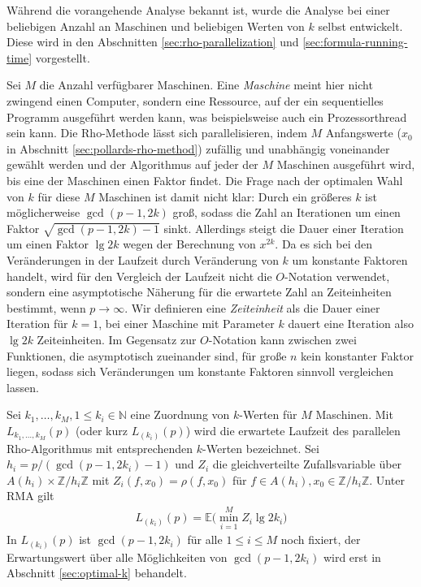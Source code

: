 \documentclass[a4paper, 11pt, ngerman]{article}
\newcommand{\E}{\mathbb{E}}
\newcommand{\N}{\mathbb{N}}
\newcommand{\Z}{\mathbb{Z}}
\theoremstyle{definition}
\theoremstyle{plain}
\theoremstyle{remark}
\begin{document}
Während die vorangehende Analyse bekannt ist, wurde die Analyse bei einer beliebigen Anzahl an Maschinen und beliebigen Werten von $k$ selbst entwickelt. Diese wird in den Abschnitten \ref{sec:rho-parallelization} und \ref{sec:formula-running-time} vorgestellt.

Sei $M$ die Anzahl verfügbarer Maschinen. Eine \emph{Maschine} meint hier nicht zwingend einen Computer, sondern eine Ressource, auf der ein sequentielles Programm ausgeführt werden kann, was beispielsweise auch ein Prozessorthread sein kann. Die Rho-Methode lässt sich parallelisieren, indem $M$ Anfangswerte ($x_0$ in Abschnitt \ref{sec:pollards-rho-method}) zufällig und unabhängig voneinander gewählt werden und der Algorithmus auf jeder der $M$ Maschinen ausgeführt wird, bis eine der Maschinen einen Faktor findet. Die Frage nach der optimalen Wahl von $k$ für diese $M$ Maschinen ist damit nicht klar: Durch ein größeres $k$ ist möglicherweise $\gcd(p - 1, 2k)$ groß, sodass die Zahl an Iterationen um einen Faktor $\sqrt{\gcd(p - 1, 2k) -1}$ sinkt. Allerdings steigt die Dauer einer Iteration um einen Faktor $\lg 2k$ wegen der Berechnung von $x^{2k}$. Da es sich bei den Veränderungen in der Laufzeit durch Veränderung von $k$ um konstante Faktoren handelt, wird für den Vergleich der Laufzeit nicht die $O$-Notation verwendet, sondern eine asymptotische Näherung für die erwartete Zahl an Zeiteinheiten bestimmt, wenn $p \to \infty$. Wir definieren eine \emph{Zeiteinheit} als die Dauer einer Iteration für $k = 1$, bei einer Maschine mit Parameter $k$ dauert eine Iteration also $\lg 2k$ Zeiteinheiten. Im Gegensatz zur $O$-Notation kann zwischen zwei Funktionen, die asymptotisch zueinander sind, für große $n$ kein konstanter Faktor liegen, sodass sich Veränderungen um konstante Faktoren sinnvoll vergleichen lassen.

Sei $k_1, \dots, k_M, 1 \le k_i \in \N$ eine Zuordnung von $k$-Werten für $M$ Maschinen. Mit $L_{k_1, \dots, k_M}(p)$ (oder kurz $L_{(k_i)}(p)$) wird die erwartete Laufzeit des parallelen Rho-Algorithmus mit entsprechenden $k$-Werten bezeichnet. Sei $h_i = p/(\gcd(p - 1, 2k_i) - 1)$ und $Z_i$ die gleichverteilte Zufallsvariable über $A(h_i) \times \Z/h_i\Z$ mit $Z_i(f, x_0) = \rho(f, x_0)$ für $f \in A(h_i), x_0 \in \Z/h_i\Z$. Unter RMA gilt
\begin{align}
    L_{(k_i)}(p) = \E \bigg ( \min_{i = 1}^M Z_i \lg 2k_i \bigg )
    \label{eq:lki-definition}
\end{align}
In $L_{(k_i)}(p)$ ist $\gcd(p - 1, 2k_i)$ für alle $1 \le i \le M$ noch fixiert, der Erwartungswert über alle Möglichkeiten von $\gcd(p - 1, 2k_i)$ wird erst in Abschnitt \ref{sec:optimal-k} behandelt.
\end{document}
